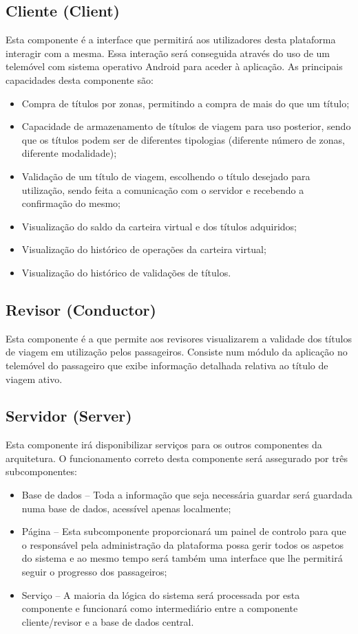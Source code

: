 \subsection{Cliente (Client)}

Esta componente é a interface que permitirá aos utilizadores desta plataforma interagir com a mesma. Essa interação será conseguida através do uso de um telemóvel com sistema operativo Android para aceder à aplicação. As principais capacidades desta componente são:
\begin{itemize}
\item Compra de títulos por zonas, permitindo a compra de mais do que um título;
\item Capacidade de armazenamento de títulos de viagem para uso posterior, sendo que os títulos podem ser de diferentes tipologias (diferente número de zonas, diferente modalidade);
\item Validação de um título de viagem, escolhendo o título desejado para utilização, sendo feita a comunicação com o servidor e recebendo a confirmação do mesmo;
\item Visualização do saldo da carteira virtual e dos títulos adquiridos;
\item Visualização do histórico de operações da carteira virtual;
\item Visualização do histórico de validações de títulos.
\end{itemize}

\subsection{Revisor (Conductor)}

Esta componente é a que permite aos revisores visualizarem a validade dos títulos de viagem em utilização pelos passageiros. Consiste num módulo da aplicação no telemóvel do passageiro que exibe informação detalhada relativa ao título de viagem ativo.

\subsection{Servidor (Server)}

Esta componente irá disponibilizar serviços para os outros componentes da arquitetura. O funcionamento correto desta componente será assegurado por três subcomponentes:
\begin{itemize}
\item Base de dados – Toda a informação que seja necessária guardar será guardada numa base de dados, acessível apenas localmente;
\item Página \web – Esta subcomponente proporcionará um painel de controlo para que o responsável pela administração da plataforma possa gerir todos os aspetos do sistema e ao mesmo tempo será também uma interface que lhe permitirá seguir o progresso dos passageiros;
\item Serviço \web – A maioria da lógica do sistema será processada por esta componente e funcionará como intermediário entre a componente cliente/revisor e a base de dados central.
\end{itemize}

